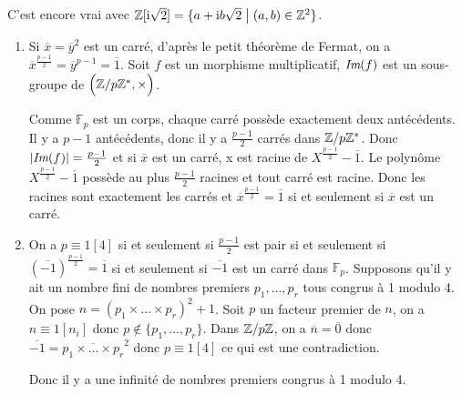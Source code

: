 \begin{remark}
	C'est encore vrai avec $\mathbb{Z}[\mathrm{i}\sqrt{2}]=\{a+\mathrm{i} b\sqrt{2}\bigm|(a,b)\in\mathbb{Z}^{2}\}$.
\end{remark}

\begin{solution}
	\phantom{}
	\begin{enumerate}
		\item Si $\overline{x}=\overline{y}^{2}$ est un carré, d'après le petit théorème de Fermat, on a $\overline{x}^{\frac{p-1}{2}}=\overline{y}^{p-1}=\overline{1}$. Soit 
		$f$ est un morphisme multiplicatif, $\emph{Im}(f)$ est un sous-groupe de $\Bigl(\mathbb{Z}/p\mathbb{Z}^{*},\times\Bigr)$.

		Comme $\mathbb{F}_{p}$ est un corps, chaque carré possède exactement deux antécédents. Il y a $p-1$ antécédents, donc il y a $\frac{p-1}{2}$ carrés dans $\mathbb{Z}/p\mathbb{Z}^{*}$. Donc $\vert\emph{Im}(f)\vert=\frac{p-1}{2}$ et si $\overline{x}$ est un carré, x est racine de $X^{\frac{p-1}{2}}-\overline{1}$. Le polynôme $X^{\frac{p-1}{2}}-\overline{1}$ possède au plus $\frac{p-1}{2}$ racines et tout carré est racine. Donc les racines sont exactement les carrés et $\overline{x}^{\frac{p-1}{2}}=\overline{1}$ si et seulement si $\overline{x}$ est un carré.

		\item On a $p\equiv1[4]$ si et seulement si $\frac{p-1}{2}$ est pair si  et seulement si $(\overline{-1})^{\frac{p-1}{2}}=\overline{1}$ si et seulement si $\overline{-1}$ est un carré dans $\mathbb{F}_{p}$.
		Supposons qu'il y ait un nombre fini de nombres premiers $p_{1},\dots,p_{r}$ tous congrus à 1 modulo 4. 
		On pose $n=(p_{1}\times\dots\times p_{r})^{2}+1$.
		Soit $p$ un facteur premier de $n$, on a $n\equiv 1[n_{i}]$ donc $p\notin\{p_{1},\dots,p_{r}\}$.
		Dans $\mathbb{Z}/p\mathbb{Z}$, on a $\overline{n}=\overline{0}$ donc $\overline{-1}=\overline{p_{1}\times\dots\times p_{r}}^{2}$ donc $p\equiv1[4]$ ce qui est une contradiction.

		Donc il y a une infinité de nombres premiers congrus à 1 modulo 4.
	\end{enumerate}
\end{solution}

